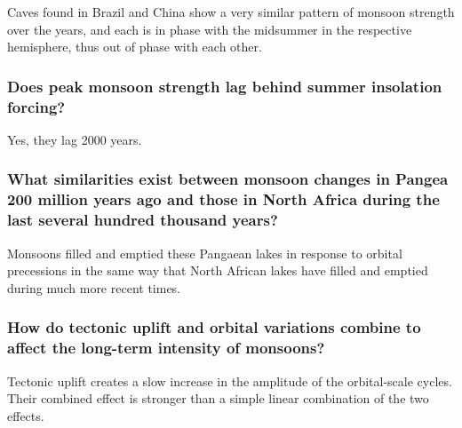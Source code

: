 Caves found in Brazil and China show a very similar pattern of monsoon strength
over the years, and each is in phase with the midsummer in the respective
hemisphere, thus out of phase with each other.

\subsubsection{Does peak monsoon strength lag behind summer insolation
forcing?}
Yes, they lag 2000 years.

\subsubsection{What similarities exist between monsoon changes in Pangea
200 million years ago and those in North Africa during the last several hundred
thousand years?}
Monsoons filled and emptied these Pangaean lakes in response to orbital
precessions in the same way that North African lakes have filled and emptied
during much more recent times.

\subsubsection{How do tectonic uplift and orbital variations combine to affect
the long-term intensity of monsoons?}
Tectonic uplift creates a slow increase in the amplitude of the orbital-scale
cycles. Their combined effect is stronger than a simple linear combination of
the two effects.

